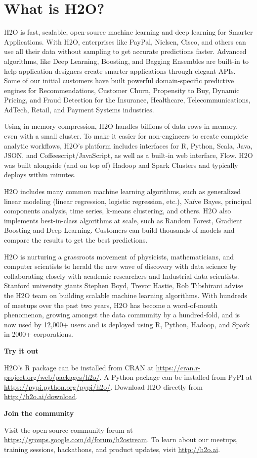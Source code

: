 \section{What is H2O?}

H2O is fast, scalable, open-source machine learning and deep learning for Smarter Applications. With H2O, enterprises like PayPal, Nielsen, Cisco, and others can use all their data without sampling to get accurate predictions faster. Advanced algorithms, like Deep Learning, Boosting, and Bagging Ensembles are built-in to help application designers create smarter applications through elegant APIs. Some of our initial customers have built powerful domain-specific predictive engines for Recommendations, Customer Churn, Propensity to Buy, Dynamic Pricing, and Fraud Detection for the Insurance, Healthcare, Telecommunications, AdTech, Retail, and Payment Systems industries.

Using in-memory compression, H2O handles billions of data rows in-memory, even with a small cluster. To make it easier for non-engineers to create complete analytic workflows, H2O's platform includes interfaces for R, Python, Scala, Java, JSON, and Coffeescript/JavaScript, as well as a built-in  web interface, Flow. H2O was built alongside (and on top of) Hadoop and Spark Clusters and typically deploys within minutes.

H2O includes many common machine learning algorithms, such as generalized linear modeling (linear regression, logistic regression, etc.), Na\"{i}ve Bayes, principal components analysis, time series, k-means clustering, and others. H2O also implements best-in-class algorithms at scale, such as Random Forest, Gradient Boosting and Deep Learning. Customers can build thousands of models and compare the results to get the best predictions.

H2O is nurturing a grassroots movement of physicists, mathematicians, and computer scientists to herald the new wave of discovery with data science by collaborating closely with academic researchers and Industrial data scientists. Stanford university giants Stephen Boyd, Trevor Hastie, Rob Tibshirani advise the H2O team on building scalable machine learning algorithms. With hundreds of meetups over the past two years, H2O has become a word-of-mouth phenomenon, growing amongst the data community by a hundred-fold, and is now used by 12,000+ users and is deployed using R, Python, Hadoop, and Spark in 2000+ corporations.

\textbf{Try it out}

H2O's R package can be installed from CRAN at {\url{https://cran.r-project.org/web/packages/h2o/}}. A Python package can be installed from PyPI at {\url{https://pypi.python.org/pypi/h2o/}}. Download H2O directly from \mbox{\url{http://h2o.ai/download}}.

\textbf{Join the community}

Visit the open source community forum at \mbox{\url{https://groups.google.com/d/forum/h2ostream}}. To learn about our meetups, training sessions, hackathons, and product updates, visit \mbox{\url{http://h2o.ai}}. 


